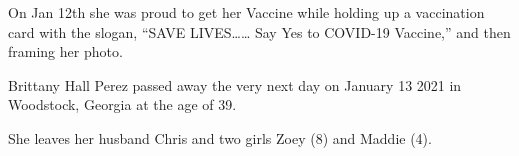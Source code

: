 On Jan 12th she was proud to get her Vaccine while holding up a vaccination card
with the slogan, “SAVE LIVES…… Say Yes to COVID-19 Vaccine,” and then framing
her photo.

Brittany Hall Perez passed away the very next day on January 13 2021 in
Woodstock, Georgia at the age of 39.

She leaves her husband Chris and two girls Zoey (8) and Maddie (4).
